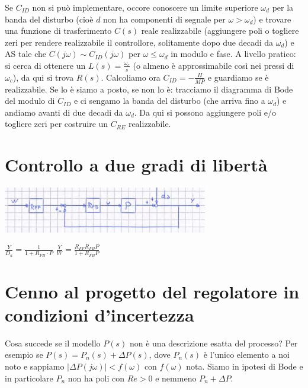    Se $C_{ID}$ non si può implementare, occore conoscere un limite superiore $\omega_d$ per la banda del disturbo (cioè $d$ non ha componenti di segnale per $\omega > \omega_d$) e trovare una funzione di trasferimento $C(s)$ reale realizzabile (aggiungere poli o togliere zeri per rendere realizzabile il controllore, solitamente dopo due decadi da $\omega_d$) e AS tale che $C(j \omega) \sim C_{ID} (j \omega)$ per $\omega \leq \omega_d$ in modulo e fase.\newline
    \newline
    A livello pratico: si cerca di ottenere un $L(s) = \frac{\omega_c}{s}$ (o almeno è approssimabile così nei pressi di $\omega_c$), da qui si trova $R(s)$. Calcoliamo ora $C_{ID} = - \frac{H}{MP}$ e guardiamo se è realizzabile. Se lo è siamo a posto, se non lo è: tracciamo il diagramma di Bode del modulo di $C_{ID}$ e ci sengamo la banda del disturbo (che arriva fino a $\omega_d$) e andiamo avanti di due decadi da $\omega_d$. Da qui si possono aggiungere poli e/o togliere zeri per costruire un $C_{RE}$ realizzabile.
    \newpage\section{Controllo a due gradi di libertà}
    \begin{center}
        \includegraphics[height=2cm]{../formulario/img5.JPG}
    \end{center}
    $\frac{Y}{D_a} = \frac{1}{1+R_{FB} \cdot P}$\newline
    $\frac{Y}{W} = \frac{R_{FF} R_{FB} P}{1 + R_{FB} P}$
    \newpage\section{Cenno al progetto del regolatore in condizioni d'incertezza}
    Cosa succede se il modello $P(s)$ non è una descrizione esatta del processo?\newline
    Per esempio se $P(s) = P_n(s) + \Delta P(s)$, dove $P_n(s)$ è l'unico elemento a noi noto e sappiamo $|\Delta P(j \omega)| < f(\omega)$ con $f(\omega)$ nota. \newline
    Siamo in ipotesi di Bode e in particolare $P_n$ non ha poli con $Re > 0$ e nemmeno $P_n + \Delta P$.\newline
